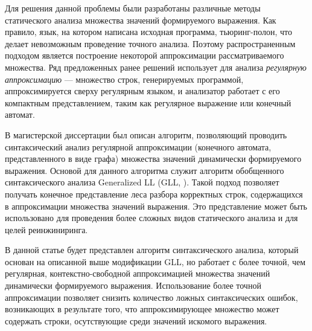 Для решения данной проблемы были разработаны различные методы статического анализа множества значений формируемого выражения. Как правило, язык, на котором написана исходная программа, тьюринг-полон, что делает невозможным проведение точного анализа. Поэтому распространенным подходом является построение некоторой аппроксимации рассматриваемого множества. Ряд предложенных ранее решений использует для анализа \textit{регулярную аппроксимацию} --- множество строк, генерируемых программой, аппроксимируется сверху регулярным языком, и анализатор работает с его компактным представлением, таким как регулярное выражение или конечный автомат.

В магистерской диссертации \cite{gll_reg} был описан алгоритм, позволяющий проводить синтаксический анализ регулярной аппроксимации (конечного автомата, представленного в виде графа) множества значений динамически формируемого выражения. Основой для данного алгоритма служит алгоритм обобщенного синтаксического анализа Generalized LL (GLL, \cite{gll}).
Такой подход позволяет получать конечное представление леса разбора \cite{sppf} корректных строк, содержащихся в аппроксимации множества значений выражения. Это представление может быть использовано для проведения более сложных видов статического анализа и для целей реинжиниринга.


В данной статье будет представлен алгоритм синтаксического анализа, который основан на описанной выше модификации GLL, но работает с более точной, чем регулярная, контекстно-свободной аппроксимацией множества значений динамически формируемого выражения. Использование более точной аппроксимации позволяет снизить количество ложных синтаксических ошибок, возникающих в результате того, что аппроксимирующее множество может содержать строки, осутствующие среди значений искомого выражения.

